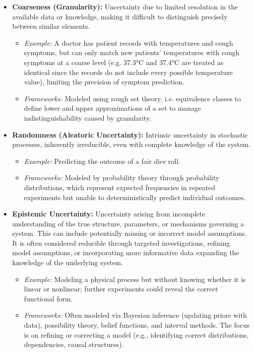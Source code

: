 \begin{itemize}
    \item \textbf{Coarseness (Granularity):} Uncertainty due to limited resolution in the available data or knowledge, making it difficult to distinguish precisely between similar elements.
    \begin{itemize}
        \item \textit{Example:} A doctor has patient records with temperatures and cough symptoms, but can only match new patients' temperatures with cough symptoms at a coarse level (e.g. 37.3°C and 37.4°C are treated as identical since the records do not include every possible temperature value), limiting the precision of symptom prediction.
        \item \textit{Frameworks:} Modeled using rough set theory, i.e. equivalence classes to define lower and upper approximations of a set to manage indistinguishability caused by granularity.
    \end{itemize}

    \item \textbf{Randomness (Aleatoric Uncertainty):} Intrinsic uncertainty in stochastic processes, inherently irreducible, even with complete knowledge of the system.
    \begin{itemize}
        \item \textit{Example:} Predicting the outcome of a fair dice roll.
        \item \textit{Frameworks:} Modeled by probability theory through probability distributions, which represent expected frequencies in repeated experiments but unable to deterministically predict individual outcomes.
    \end{itemize}

    \item \textbf{Epistemic Uncertainty:} Uncertainty arising from incomplete understanding of the true structure, parameters, or mechanisms governing a system. This can include potentially missing or incorrect model assumptions. It is often considered reducible through targeted investigations, refining model assumptions, or incorporating more informative data expanding the knowledge of the underlying system.

    \begin{itemize}
        \item \textit{Example:} Modeling a physical process but without knowing whether it is linear or nonlinear; further experiments could reveal the correct functional form.
        \item \textit{Frameworks:} Often modeled via Bayesian inference (updating priors with data), possibility theory, belief functions, and interval methods. The focus is on refining or correcting a model (e.g., identifying correct distributions, dependencies, causal structures).
    \end{itemize}


\end{itemize}
